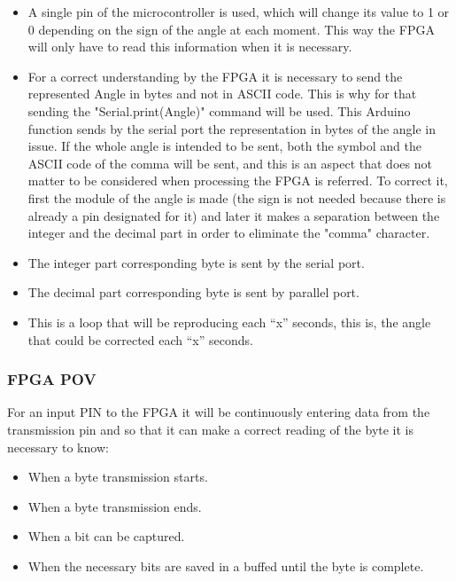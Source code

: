 \begin{itemize}	
	\item A single pin of the microcontroller is used, which will change its value to 1 or 0 depending on the sign of the angle at each moment. This way the FPGA will only have to read this information when it is necessary.
	
	\item For a correct understanding by the FPGA it is necessary to send the represented Angle in bytes and not in ASCII code. This is why for that sending the "Serial.print(Angle)" command will be used. This Arduino function sends by the serial port the representation in bytes of the angle in issue.\newline
	If the whole angle is intended to be sent, both the symbol and the ASCII code of the comma will be sent, and this is an aspect that does not matter to be considered when processing the FPGA is referred. To correct it, first the module of the angle is made (the sign is not needed because there is already a pin designated for it) and later it makes a separation between the integer and the decimal part in order to eliminate the "comma" character.
	\item The integer part corresponding byte is sent by the serial port.
	\item The decimal part corresponding byte is sent by parallel port.
	\item This is a loop that will be reproducing each “x” seconds, this is, the angle that could be corrected each “x” seconds. 
\end{itemize}


\subsubsection{FPGA POV} \label{sec:vista_fpga}

For an input PIN to the FPGA it will be continuously entering data from the transmission pin and so that it can make a correct reading of the byte it is necessary to know: 

\begin{itemize}
	\item When a byte transmission starts.
	\item When a byte transmission ends.
	\item When a bit can be captured. 
	\item When the necessary bits are saved in a buffed until the byte is complete.
\end{itemize}

